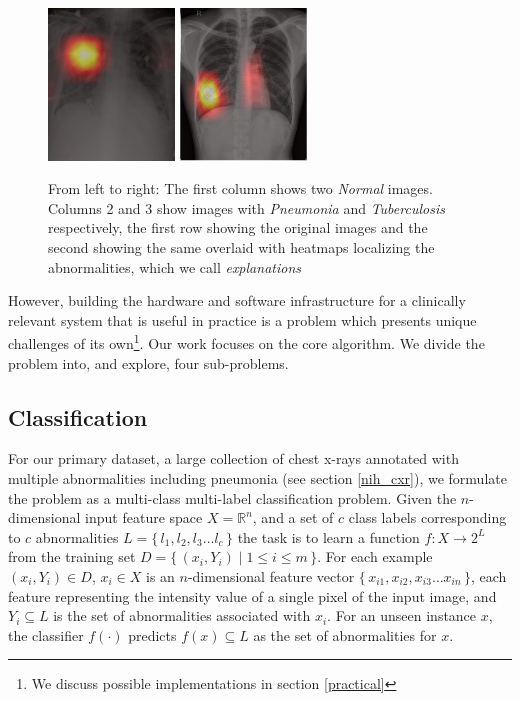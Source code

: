 \documentclass[12pt,twoside,a4paper]{report}
\begin{document}
\begin{figure}
  \includegraphics[width=0.3\textwidth]{images/consolidation_heatmap}\hspace{0.01\textwidth}%
  \includegraphics[width=0.3\textwidth]{images/TB_heatmap}
  \caption{From left to right: The first column shows two \emph{Normal} images.
    Columns 2 and 3 show images with \emph{Pneumonia} and \emph{Tuberculosis}
    respectively, the first row showing the original images and the second
    showing the same overlaid with heatmaps localizing the abnormalities, which
    we call \emph{explanations}}
  \label{basic_examples}
\end{figure}

However, building the hardware and software infrastructure for a clinically
relevant system that is useful in practice is a problem which presents unique
challenges of its own\footnote{We discuss possible implementations in section
  \ref{practical}}. Our work focuses on the core algorithm. We divide the
problem into, and explore, four sub-problems.
\pagebreak[4]
\subsection{Classification}
    
For our primary dataset, a large collection of chest x-rays annotated with
multiple abnormalities including pneumonia \cite{Wang2017a} (see section
\ref{nih_cxr}), we formulate the problem as a multi-class multi-label
classification problem. Given the $n$-dimensional input feature space $X =
\mathbb{R} ^n$, and a set of $c$ class labels corresponding to $c$ abnormalities
$L = \{\,l_1 ,l_2 ,l_3 \dots l_c\,\}$ the task is to learn a function $f:X
\rightarrow 2^L$ from the training set $D = \{\,(x_i, Y_i) \mid 1 \leq i \leq m
\,\}$. For each example $(x_i, Y_i) \in D$, $x_i \in X$ is an $n$-dimensional
feature vector $\{\, x_{i1}, x_{i2}, x_{i3} \dots x_{in} \,\}$, each feature
representing the intensity value of a single pixel of the input image, and $Y_i
\subseteq L $ is the set of abnormalities associated with $x_i$. For an unseen
instance $x$, the classifier $f(\cdot)$ predicts $f(x) \subseteq L$ as the set
of abnormalities for
$x$.\\
\end{document}
